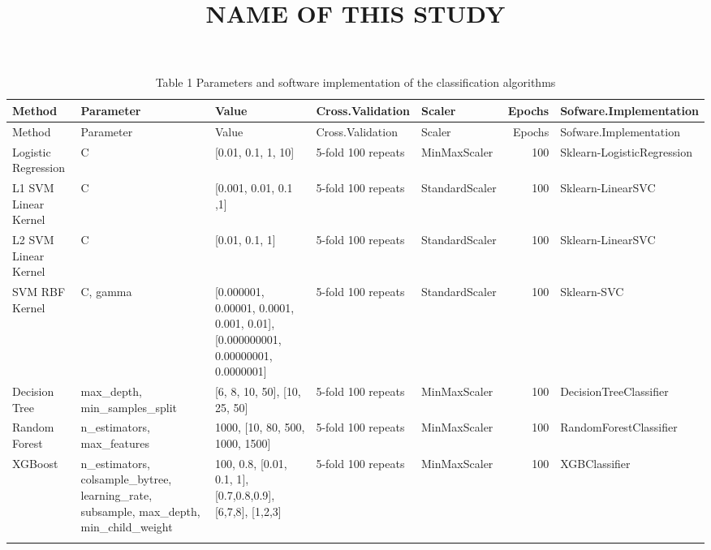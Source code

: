 \documentclass[11pt,]{article}
\title{\textbf{NAME OF THIS STUDY}}
\author{}
\date{}
\begin{document}
\maketitle

\begin{longtable}[]{@{}lllllrl@{}}
\caption{Table 1 Parameters and software implementation of the
classification algorithms}\tabularnewline
\toprule
Method & Parameter & Value & Cross.Validation & Scaler & Epochs &
Sofware.Implementation\tabularnewline
\midrule
\endfirsthead
\toprule
Method & Parameter & Value & Cross.Validation & Scaler & Epochs &
Sofware.Implementation\tabularnewline
\midrule
\endhead
Logistic Regression & C & {[}0.01, 0.1, 1, 10{]} & 5-fold 100 repeats &
MinMaxScaler & 100 & Sklearn-LogisticRegression\tabularnewline
L1 SVM Linear Kernel & C & {[}0.001, 0.01, 0.1 ,1{]} & 5-fold 100
repeats & StandardScaler & 100 & Sklearn-LinearSVC\tabularnewline
L2 SVM Linear Kernel & C & {[}0.01, 0.1, 1{]} & 5-fold 100 repeats &
StandardScaler & 100 & Sklearn-LinearSVC\tabularnewline
SVM RBF Kernel & C, gamma & {[}0.000001, 0.00001, 0.0001, 0.001,
0.01{]}, {[}0.000000001, 0.00000001, 0.0000001{]} & 5-fold 100 repeats &
StandardScaler & 100 & Sklearn-SVC\tabularnewline
Decision Tree & max\_depth, min\_samples\_split & {[}6, 8, 10, 50{]},
{[}10, 25, 50{]} & 5-fold 100 repeats & MinMaxScaler & 100 &
DecisionTreeClassifier\tabularnewline
Random Forest & n\_estimators, max\_features & 1000, {[}10, 80, 500,
1000, 1500{]} & 5-fold 100 repeats & MinMaxScaler & 100 &
RandomForestClassifier\tabularnewline
XGBoost & n\_estimators, colsample\_bytree, learning\_rate, subsample,
max\_depth, min\_child\_weight & 100, 0.8, {[}0.01, 0.1, 1{]},
{[}0.7,0.8,0.9{]}, {[}6,7,8{]}, {[}1,2,3{]} & 5-fold 100 repeats &
MinMaxScaler & 100 & XGBClassifier\tabularnewline
\begin{minipage}[t]{0.14\columnwidth}\raggedright\strut
\vspace{35mm}\strut
\end{minipage} & \begin{minipage}[t]{0.14\columnwidth}\raggedright\strut
\strut
\end{minipage} & \begin{minipage}[t]{0.14\columnwidth}\raggedright\strut
\strut
\end{minipage} & \begin{minipage}[t]{0.14\columnwidth}\raggedright\strut
\strut
\end{minipage} & \begin{minipage}[t]{0.14\columnwidth}\raggedright\strut
\strut
\end{minipage} & \begin{minipage}[t]{0.14\columnwidth}\raggedleft\strut
\strut
\end{minipage} & \begin{minipage}[t]{0.14\columnwidth}\raggedright\strut
\strut
\end{minipage}\tabularnewline
\bottomrule
\end{longtable}
\end{document}

